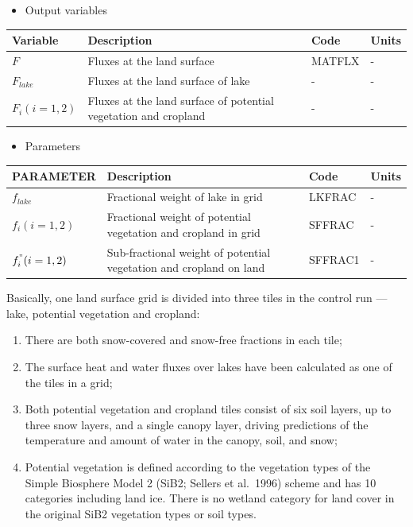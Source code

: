 \begin{itemize}
\tightlist
\item
  Output variables
\end{itemize}

\begin{longtable}[]{@{}llll@{}}
\toprule
Variable & Description & Code & Units \\
\midrule
\endhead
\(F\) & Fluxes at the land surface & MATFLX & - \\
\(F_{lake}\) & Fluxes at the land surface of lake & - & - \\
\(F_i(i=1,2)\) & Fluxes at the land surface of potential vegetation and cropland & - & - \\
\bottomrule
\end{longtable}

\begin{itemize}
\tightlist
\item
  Parameters
\end{itemize}

\begin{landscape}

\begin{longtable}[]{@{}llll@{}}
\toprule
PARAMETER & Description & Code & Units \\
\midrule
\endhead
\(f_{lake}\) & Fractional weight of lake in grid & LKFRAC & - \\
\(f_i(i=1,2)\) & Fractional weight of potential vegetation and cropland in grid & SFFRAC & - \\
\(f_i^"(i=1,2)\) & Sub-fractional weight of potential vegetation and cropland on land & SFFRAC1 & - \\
\bottomrule
\end{longtable}

\end{landscape}

Basically, one land surface grid is divided into three tiles in the control run --- lake, potential vegetation and cropland:

\begin{enumerate}
\def\labelenumi{\arabic{enumi}.}
\tightlist
\item
  There are both snow-covered and snow-free fractions in each tile;
\item
  The surface heat and water fluxes over lakes have been calculated as one of the tiles in a grid;
\item
  Both potential vegetation and cropland tiles consist of six soil layers, up to three snow layers, and a single canopy layer, driving predictions of the temperature and amount of water in the canopy,
  soil, and snow;
\item
  Potential vegetation is defined according to the vegetation types of the Simple Biosphere Model 2 (SiB2; Sellers et al.~1996) scheme and has 10 categories including land ice. There is no wetland
  category for land cover in the original SiB2 vegetation types or soil types.
\end{enumerate}

